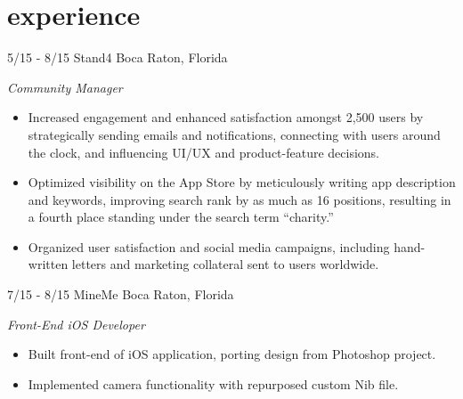 \documentclass[print]{resume}
\begin{document}
\vspace{-20pt} %

\section{experience}
\begin{entrylist}

\entry
{5/15 - 8/15}
{Stand4}
{Boca Raton, Florida}
{
\emph{Community Manager}
\begin{itemize}
    \item Increased engagement and enhanced satisfaction amongst 2,500 users by 
    strategically sending emails and notifications, connecting with users around the 
    clock, and influencing UI/UX and product-feature decisions.
    \item Optimized visibility on the App Store by meticulously writing app description 
    and keywords, improving search rank by as much as 16 positions, resulting in a fourth 
    place standing under the search term ``charity.''
    \item Organized user satisfaction and social media campaigns, including hand-written 
    letters and marketing collateral sent to users worldwide.
\end{itemize} 
}

\entry
{7/15 - 8/15}
{MineMe}
{Boca Raton, Florida}
{
\emph{Front-End iOS Developer}
\begin{itemize}
    \item Built front-end of iOS application, porting design from Photoshop 
    project.
	\item Implemented camera functionality with repurposed custom Nib file.
\end{itemize}
}


\end{entrylist}
\end{document}
